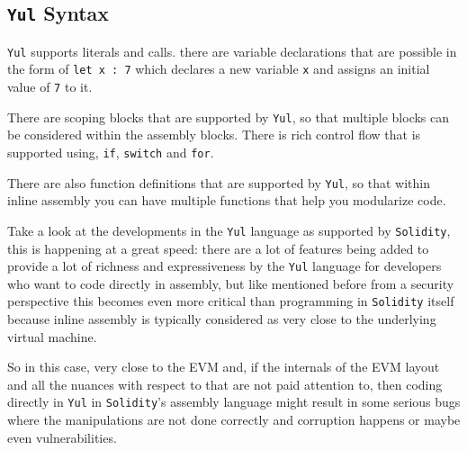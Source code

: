 \subsection{\texorpdfstring{\texttt{Yul}
Syntax}{Yul Syntax}}\label{yul-syntax}

\texttt{Yul} supports literals and calls. there are variable
declarations that are possible in the form of \texttt{let\ x\ :\ 7}
which declares a new variable \texttt{x} and assigns an initial value of
\texttt{7} to it.

There are scoping blocks that are supported by \texttt{Yul}, so that
multiple blocks can be considered within the assembly blocks. There is
rich control flow that is supported using, \texttt{if}, \texttt{switch}
and \texttt{for}.

There are also function definitions that are supported by \texttt{Yul},
so that within inline assembly you can have multiple functions that help
you modularize code.

Take a look at the developments in the \texttt{Yul} language as
supported by \texttt{Solidity}, this is happening at a great speed:
there are a lot of features being added to provide a lot of richness and
expressiveness by the \texttt{Yul} language for developers who want to
code directly in assembly, but like mentioned before from a security
perspective this becomes even more critical than programming in
\texttt{Solidity} itself because inline assembly is typically considered
as very close to the underlying virtual machine.

So in this case, very close to the EVM and, if the internals of the EVM
layout and all the nuances with respect to that are not paid attention
to, then coding directly in \texttt{Yul} in \texttt{Solidity}'s assembly
language might result in some serious bugs where the manipulations are
not done correctly and corruption happens or maybe even vulnerabilities.
